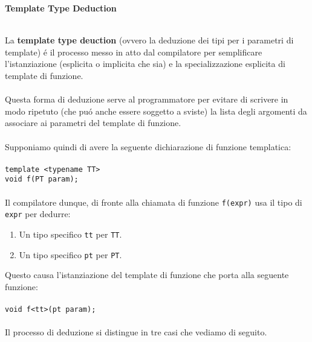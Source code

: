 \documentclass{article}
\begin{document}
\begin{large} \textbf{\textcolor{blu}{Template Type Deduction}} \\ \\ \end{large}
La \textbf{template type deuction} (ovvero la deduzione dei tipi per i parametri di template) \'e il processo messo in atto dal compilatore per semplificare l'istanziazione (esplicita o implicita che sia) e la specializzazione esplicita di template di funzione.\\ \\Questa forma di deduzione serve al programmatore per evitare di scrivere in modo ripetuto (che pu\'o anche essere soggetto a sviste) la lista degli argomenti da associare ai parametri del template di funzione.\\ \\Supponiamo quindi di avere la seguente dichiarazione di funzione templatica: \\ \\
\texttt{template <typename TT>\\void f(PT param);} \\ \\
Il compilatore dunque, di fronte alla chiamata di funzione \texttt{f(expr)} usa il tipo di \texttt{expr} per dedurre:
\begin{enumerate}
\item Un tipo specifico \texttt{tt} per \texttt{TT}.
\item Un tipo specifico \texttt{pt} per \texttt{PT}.
\end{enumerate}
Questo causa l'istanziazione del template di funzione che porta alla seguente funzione:\\ \\
\texttt{void f<tt>(pt param);}\\ \\
Il processo di deduzione si distingue in tre casi che vediamo di seguito.\\
\end{document}
